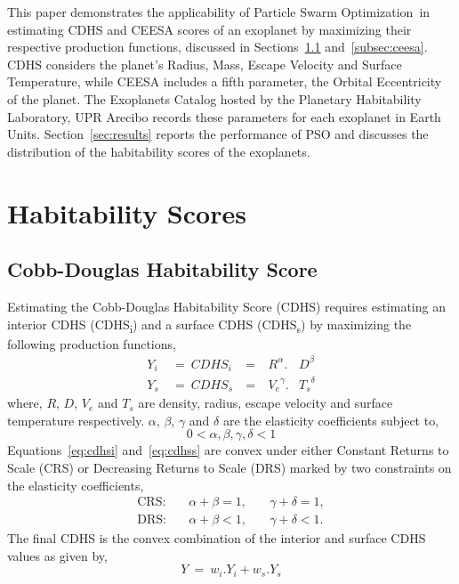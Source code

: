 \documentclass[9pt]{article}
\newcommand{\pso}{Particle Swarm Optimization}
\begin{document}
This paper demonstrates the applicability of \pso\ in estimating CDHS and CEESA scores of an exoplanet by maximizing
their respective production functions, discussed in Sections~\ref{subsec:cdhs} and~\ref{subsec:ceesa}. CDHS considers
the planet's Radius, Mass, Escape Velocity and Surface Temperature, while CEESA includes a fifth parameter, the Orbital
Eccentricity of the planet. The Exoplanets Catalog hosted by the Planetary Habitability Laboratory, UPR Arecibo records
these parameters for each exoplanet in Earth Units. Section~\ref{sec:results} reports the performance of PSO and
discusses the distribution of the habitability scores of the exoplanets.


\section{Habitability Scores}\label{sec:habscore}

\subsection{Cobb-Douglas Habitability Score}\label{subsec:cdhs}
Estimating the Cobb-Douglas Habitability Score (CDHS) requires estimating an interior CDHS (CDHS\textsubscript{i}) and a
surface CDHS (CDHS\textsubscript{s}) by maximizing the following production functions,
\begin{subequations}
  \begin{alignat}{4}
    Y_i\ &=\ {CDHS}_i\ &=&\ R^\alpha.&D^\beta\label{eq:cdhsi}\\
    Y_s\ &=\ {CDHS}_s\ &=&\ {V_e}^\gamma.&{T_s}^\delta\label{eq:cdhss}
  \end{alignat}
\end{subequations}
where, $R$, $D$, $V_e$ and $T_s$ are density, radius, escape velocity and surface temperature respectively. $\alpha$,
$\beta$, $\gamma$ and $\delta$ are the elasticity coefficients subject to,
\begin{equation}
  0 < \alpha,\beta,\gamma,\delta < 1
\end{equation}
Equations~\ref{eq:cdhsi} and~\ref{eq:cdhss} are convex under either Constant Returns to Scale (CRS) or Decreasing
Returns to Scale (DRS) marked by two constraints on the elasticity coefficients,
\begin{subequations}
  \begin{alignat}{3}
    \text{CRS:} & \quad\alpha+\beta = 1,&\quad\gamma+\delta = 1,\\
    \text{DRS:} & \quad\alpha+\beta < 1,&\quad\gamma+\delta < 1.
  \end{alignat}
\end{subequations}
The final CDHS is the convex combination of the interior and surface CDHS values as given by,
\begin{equation}
  Y\ =\ w_i.Y_i + w_s.Y_s
\end{equation}
\end{document}
